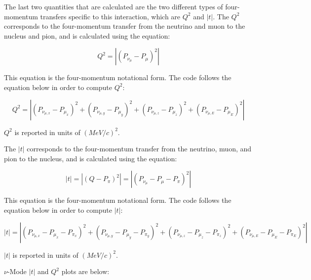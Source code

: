 \documentclass[11pt]{article}
\begin{document}
The last two quantities that are calculated are the two different types of four-momentum transfers specific to this interaction, which are $Q^2$ and $|t|$. The $Q^2$ corresponds to the four-momentum transfer from the neutrino and muon to the nucleus and pion, and is calculated using the equation:

\begin{equation}
Q^2 = |(P_{\nu_\mu} - P_\mu)^2|
\end{equation}

\noindent
This equation is the four-momentum notational form. The code follows the equation below in order to compute $Q^2$:

\begin{equation}
Q^2 = |(P_{\nu_{\mu,x}} - P_{\mu_x})^2 + (P_{\nu_{\mu,y}} - P_{\mu_y})^2 + (P_{\nu_{\mu,z}} - P_{\mu_z})^2 + (P_{\nu_{\mu,E}} - P_{\mu_E})^2|
\end{equation}

\noindent
$Q^2$ is reported in units of $(MeV/c)^2$.

The $|t|$ corresponds to the four-momentum transfer from the neutrino, muon, and pion to the nucleus, and is calculated using the equation:

\begin{equation}
|t| = |(Q - P_\pi)^2| = |(P_{\nu_\mu} - P_\mu - P_\pi)^2|
\end{equation}

\noindent
This equation is the four-momentum notational form. The code follows the equation below in order to compute $|t|$:

\begin{equation}
|t| = |(P_{\nu_{\mu,x}} - P_{\mu_x} - P_{\pi_x})^2 + (P_{\nu_{\mu,y}} - P_{\mu_y} - P_{\pi_y})^2 + (P_{\nu_{\mu,z}} - P_{\mu_z} - P_{\pi_z})^2 + (P_{\nu_{\mu,E}} - P_{\mu_E} - P_{\pi_E})^2|
\end{equation}

\noindent
$|t|$ is reported in units of $(MeV/c)^2$.


$\nu$-Mode $|t|$ and $Q^2$ plots are below:
\end{document}
